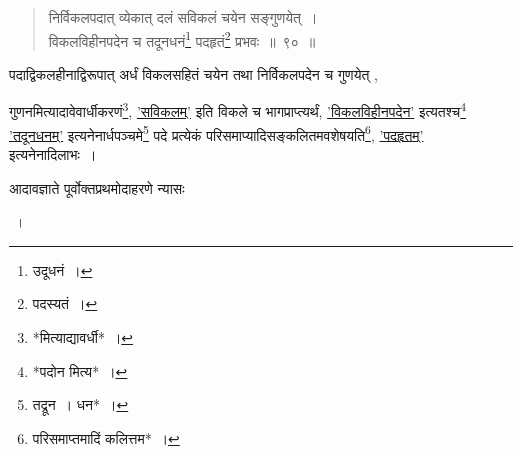 \documentclass[10pt, openany]{book}
\begin{document}
{{{{{{{\begin{quote}
{\bs निर्विकलपदात् व्येकात् दलं सविकलं चयेन सङ्गुणयेत्~।\\
 विकलविहीनपदेन च तदूनधनं\renewcommand{\thefootnote}{१२}\footnote {उदूधनं~।}  पदहृतं\renewcommand{\thefootnote}{१३}\footnote{पदस्यतं~।}  प्रभवः~॥~९०~॥}\end{quote}

{पदाद्विकलहीनाद्विरूपात् अर्धं विकलसहितं चयेन तथा निर्विकलपदेन च
गुणयेत् ,}

\newpage

{गुणनमित्यादावेवार्धीकरणं\renewcommand{\thefootnote}{२}\footnote {*मित्याद्यावर्धी*~।}, \hyperref[90]{'सविकलम्'} इति विकले च भागप्राप्त्यर्थं,
\hyperref[90]{'विकलविहीनपदेन'} इत्यतश्च\renewcommand{\thefootnote}{३}\footnote{*पदोन मित्य*~।}  \hyperref[90]{'तदूनधनम्'} इत्यनेनार्धपञ्चमे\renewcommand{\thefootnote}{४}\footnote {तद्रून~। धन*~।}  पदे प्रत्येकं
परिसमाप्यादिसङ्कलितमवशेषयति\renewcommand{\thefootnote}{५}\footnote {परिसमाप्तमादिं कलित्तम*~।}, \hyperref[90]{'पदहृतम्'} इत्यनेनादिलाभः~।}
\vspace{3mm}

{आदावज्ञाते पूर्वोक्तप्रथमोदाहरणे न्यासः\textemdash}
\vspace{2mm}

 ~। 
\vspace{3mm}

}}}}}}}
\end{document}
